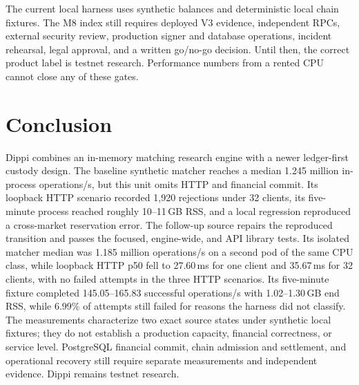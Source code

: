 \documentclass[envcountsame,runningheads,notitlepage]{llncs}
\begin{document}
The current local harness uses synthetic balances and deterministic local chain fixtures. The M8 index still requires deployed V3 evidence, independent RPCs, external security review, production signer and database operations, incident rehearsal, legal approval, and a written go/no-go decision. Until then, the correct product label is testnet research. Performance numbers from a rented CPU cannot close any of these gates.\cite{m8,plan}

\section{Conclusion}
Dippi combines an in-memory matching research engine with a newer ledger-first custody design. The baseline synthetic matcher reaches a median 1.245 million in-process operations/s, but this unit omits HTTP and financial commit. Its loopback HTTP scenario recorded 1,920 rejections under 32 clients, its five-minute process reached roughly 10--11\,GB RSS, and a local regression reproduced a cross-market reservation error. The follow-up source repairs the reproduced transition and passes the focused, engine-wide, and API library tests. Its isolated matcher median was 1.185 million operations/s on a second pod of the same CPU class, while loopback HTTP p50 fell to 27.60\,ms for one client and 35.67\,ms for 32 clients, with no failed attempts in the three HTTP scenarios. Its five-minute fixture completed 145.05--165.83 successful operations/s with 1.02--1.30\,GB end RSS, while 6.99\% of attempts still failed for reasons the harness did not classify. The measurements characterize two exact source states under synthetic local fixtures; they do not establish a production capacity, financial correctness, or service level. PostgreSQL financial commit, chain admission and settlement, and operational recovery still require separate measurements and independent evidence. Dippi remains testnet research.

\appendix
\end{document}
